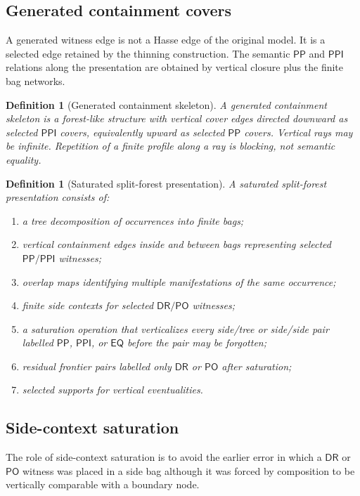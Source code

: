 \documentclass[11pt]{article}
\newtheorem{definition}[theorem]{Definition}
\newcommand{\EQ}{\mathsf{EQ}}
\newcommand{\PP}{\mathsf{PP}}
\newcommand{\PPI}{\mathsf{PPI}}
\newcommand{\PO}{\mathsf{PO}}
\newcommand{\DR}{\mathsf{DR}}
\begin{document}
\subsection{Generated containment covers}

A generated witness edge is not a Hasse edge of the original model.  It is a selected edge retained by the thinning construction.  The semantic $\PP$ and $\PPI$ relations along the presentation are obtained by vertical closure plus the finite bag networks.

\begin{definition}[Generated containment skeleton]
A generated containment skeleton is a forest-like structure with vertical cover edges directed downward as selected $\PPI$ covers, equivalently upward as selected $\PP$ covers.  Vertical rays may be infinite.  Repetition of a finite profile along a ray is blocking, not semantic equality.
\end{definition}

\begin{definition}[Saturated split-forest presentation]
A saturated split-forest presentation consists of:
\begin{enumerate}[label=(SF\arabic*)]
\item a tree decomposition of occurrences into finite bags;
\item vertical containment edges inside and between bags representing selected $\PP/\PPI$ witnesses;
\item overlap maps identifying multiple manifestations of the same occurrence;
\item finite side contexts for selected $\DR/\PO$ witnesses;
\item a saturation operation that verticalizes every side/tree or side/side pair labelled $\PP$, $\PPI$, or $\EQ$ before the pair may be forgotten;
\item residual frontier pairs labelled only $\DR$ or $\PO$ after saturation;
\item selected supports for vertical eventualities.
\end{enumerate}
\end{definition}

\subsection{Side-context saturation}

The role of side-context saturation is to avoid the earlier error in which a $\DR$ or $\PO$ witness was placed in a side bag although it was forced by composition to be vertically comparable with a boundary node.
\end{document}
